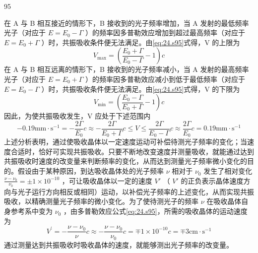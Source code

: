 \begin{solution}{95}
\begin{subsolution}
在 A 与 B 相互接近的情形下，B 接收到的光子频率增加，当 A 发射的最低频率光子（对应于 $E = E_{0} - \Gamma$ ）的频率因多普勒效应增加到超过最高频率（对应于 $E = E_{0} + \Gamma$ ）时，共振吸收条件便无法满足。由\eqref{eq:24.s95}式得，V 的上限为
\begin{equation}
V _ {\max} = \left(\frac {E _ {0} + \Gamma}{E _ {0} - \Gamma} - 1\right) c
\label{eq:25.s95}
\end{equation}
在 A 与 B 相互远离的情形下，B 接收到的光子频率减小，当 A 发射的最高频率光子（对应于 $E = E_{0} + \Gamma$ ）的频率因多普勒效应减小到低于最低频率（对应于 $E = E_{0} - \Gamma$ ）时，共振吸收条件便无法满足。由\eqref{eq:24.s95}式得，V 的下限为
\begin{equation}
V _ {\min} = \left(\frac {E _ {0} - \Gamma}{E _ {0} + \Gamma} - 1\right) c
\label{eq:26.s95}
\end{equation}
因此，为使共振吸收发生，V 应处于下述范围内
\begin{equation}
- 0. 1 9 \mathrm{mm} \cdot \mathrm{s} ^ {- 1} = - \frac {2 \Gamma}{E _ {0}} c \approx - \frac {2 \Gamma}{E _ {0} + \Gamma} c \leq V \leq \frac {2 \Gamma}{E _ {0} - \Gamma} c \approx \frac {2 \Gamma}{E _ {0}} c = 0. 1 9 \mathrm{mm} \cdot \mathrm{s} ^ {- 1}
\label{eq:27.s95}
\end{equation}
上述分析表明，通过使吸收晶体以一定速度运动可补偿待测光子频率的变化；当速度合适时，恰好可实现共振吸收。只要不断地改变速度并测量吸收，就能通过达到共振吸收时速度的改变量来判断频率的变化，从而达到测量光子频率微小变化的目的。假设由于某种原因，到达吸收晶体处的光子频率 $\nu$ 相对于 $\nu_{0}$ 发生了相对变化 $\frac{\nu - \nu_{0}}{\nu_{0}} = \pm 1 \times 10^{-10}$ ，可让吸收晶体以一定的速度 $V'$ （ $V'$ 的正负表示晶体速度方向与光子运行方向相反或相同）运动，以补偿光子频率的上述变化，从而实现共振吸收，以精确测量光子频率的微小变化。为了使待测光子的频率 $\nu$ 在吸收晶体自身参考系中变为 $\nu_{0}$ ，由多普勒效应公式\eqref{eq:24.s95}，所需的吸收晶体的运动速度为
\begin{equation}
V ^ {\prime} = - \frac {\nu - \nu _ {0}}{\nu} c \approx - \frac {\nu - \nu _ {0}}{\nu _ {0}} c = \mp 1 \times 1 0 ^ {- 1 0} c = \mp 3 \mathrm{cm} \cdot \mathrm{s} ^ {- 1}
\label{eq:28.s95}
\end{equation}
通过测量达到共振吸收时吸收晶体的速度，就能够测出光子频率的改变量。
\end{subsolution}
\end{solution}